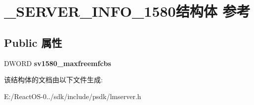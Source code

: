 \hypertarget{struct___s_e_r_v_e_r___i_n_f_o__1580}{}\section{\+\_\+\+S\+E\+R\+V\+E\+R\+\_\+\+I\+N\+F\+O\+\_\+1580结构体 参考}
\label{struct___s_e_r_v_e_r___i_n_f_o__1580}
\subsection*{Public 属性}
\begin{DoxyCompactItemize}
\item 
\mbox{\label{struct___s_e_r_v_e_r___i_n_f_o__1580_a4fc5ef44f76c8dfa2368f7ddbd9f203f}} 
D\+W\+O\+RD {\bfseries sv1580\+\_\+maxfreemfcbs}
\end{DoxyCompactItemize}


该结构体的文档由以下文件生成\+:\begin{DoxyCompactItemize}
\item 
E\+:/\+React\+O\+S-\/0../sdk/include/psdk/lmserver.\+h\end{DoxyCompactItemize}
